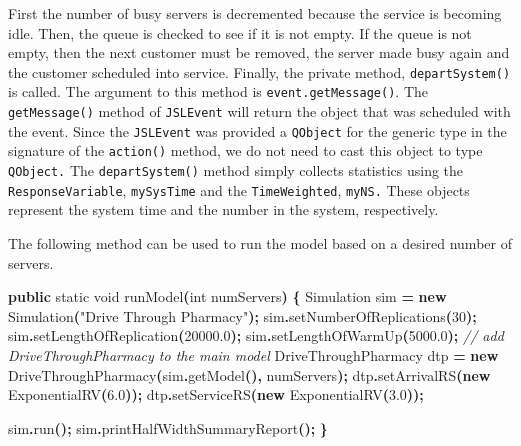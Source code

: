 \documentclass[
]{book}
\newenvironment{Shaded}{\begin{snugshade}}{\end{snugshade}}
\newcommand{\CommentTok}[1]{\textcolor[rgb]{0.56,0.35,0.01}{\textit{#1}}}
\newcommand{\DataTypeTok}[1]{\textcolor[rgb]{0.13,0.29,0.53}{#1}}
\newcommand{\DecValTok}[1]{\textcolor[rgb]{0.00,0.00,0.81}{#1}}
\newcommand{\FloatTok}[1]{\textcolor[rgb]{0.00,0.00,0.81}{#1}}
\newcommand{\FunctionTok}[1]{\textcolor[rgb]{0.00,0.00,0.00}{#1}}
\newcommand{\KeywordTok}[1]{\textcolor[rgb]{0.13,0.29,0.53}{\textbf{#1}}}
\newcommand{\NormalTok}[1]{#1}
\newcommand{\OperatorTok}[1]{\textcolor[rgb]{0.81,0.36,0.00}{\textbf{#1}}}
\newcommand{\StringTok}[1]{\textcolor[rgb]{0.31,0.60,0.02}{#1}}
\theoremstyle{definition}
\theoremstyle{definition}
\theoremstyle{definition}
\theoremstyle{definition}
\theoremstyle{remark}
\begin{document}
First the number of busy servers is decremented
because the service is becoming idle. Then, the queue is
checked to see if it is not empty. If the queue is not empty, then the
next customer must be removed, the server made busy again
and the customer scheduled into service. Finally, the
private method, \texttt{departSystem()} is called. The argument to this method is
\texttt{event.getMessage()}. The \texttt{getMessage()} method of \texttt{JSLEvent} will
return the object that was scheduled with the event. Since the \texttt{JSLEvent} was provided a \texttt{QObject} for the generic type in the signature of the \texttt{action()} method, we do not need to cast this object to type \texttt{QObject.} The \texttt{departSystem()} method simply collects
statistics using the \texttt{ResponseVariable}, \texttt{mySysTime} and the \texttt{TimeWeighted},
\texttt{myNS.} These objects represent the system time and the number in the
system, respectively.

The following method can be used to run the model based on a desired number of servers.

\begin{Shaded}
\begin{Highlighting}[]
    \KeywordTok{public} \DataTypeTok{static} \DataTypeTok{void} \FunctionTok{runModel}\OperatorTok{(}\DataTypeTok{int}\NormalTok{ numServers}\OperatorTok{)} \OperatorTok{\{}
\NormalTok{        Simulation sim }\OperatorTok{=} \KeywordTok{new} \FunctionTok{Simulation}\OperatorTok{(}\StringTok{"Drive Through Pharmacy"}\OperatorTok{);}
\NormalTok{        sim}\OperatorTok{.}\FunctionTok{setNumberOfReplications}\OperatorTok{(}\DecValTok{30}\OperatorTok{);}
\NormalTok{        sim}\OperatorTok{.}\FunctionTok{setLengthOfReplication}\OperatorTok{(}\FloatTok{20000.0}\OperatorTok{);}
\NormalTok{        sim}\OperatorTok{.}\FunctionTok{setLengthOfWarmUp}\OperatorTok{(}\FloatTok{5000.0}\OperatorTok{);}
        \CommentTok{// add DriveThroughPharmacy to the main model}
\NormalTok{        DriveThroughPharmacy dtp }\OperatorTok{=} \KeywordTok{new} \FunctionTok{DriveThroughPharmacy}\OperatorTok{(}\NormalTok{sim}\OperatorTok{.}\FunctionTok{getModel}\OperatorTok{(),}\NormalTok{ numServers}\OperatorTok{);}
\NormalTok{        dtp}\OperatorTok{.}\FunctionTok{setArrivalRS}\OperatorTok{(}\KeywordTok{new} \FunctionTok{ExponentialRV}\OperatorTok{(}\FloatTok{6.0}\OperatorTok{));}
\NormalTok{        dtp}\OperatorTok{.}\FunctionTok{setServiceRS}\OperatorTok{(}\KeywordTok{new} \FunctionTok{ExponentialRV}\OperatorTok{(}\FloatTok{3.0}\OperatorTok{));}

\NormalTok{        sim}\OperatorTok{.}\FunctionTok{run}\OperatorTok{();}
\NormalTok{        sim}\OperatorTok{.}\FunctionTok{printHalfWidthSummaryReport}\OperatorTok{();}
    \OperatorTok{\}}
\end{Highlighting}
\end{Shaded}
\end{document}
